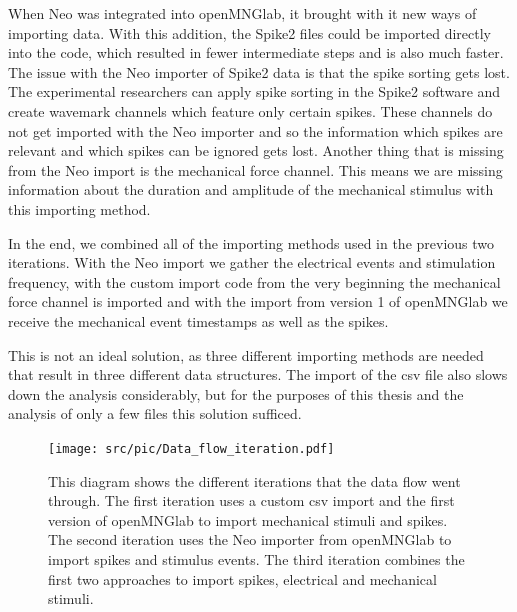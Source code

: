 When Neo was integrated into openMNGlab, it brought with it new ways of importing data. With this addition, the Spike2 files could be imported directly into the code, which resulted in fewer intermediate steps and is also much faster. The issue with the Neo importer of Spike2 data is that the spike sorting gets lost. The experimental researchers can apply spike sorting in the Spike2 software and create wavemark channels which feature only certain spikes. These channels do not get imported with the Neo importer and so the information which spikes are relevant and which spikes can be ignored gets lost. Another thing that is missing from the Neo import is the mechanical force channel. This means we are missing information about the duration and amplitude of the mechanical stimulus with this importing method.

In the end, we combined all of the importing methods used in the previous two iterations. With the Neo import we gather the electrical events and stimulation frequency, with the custom import code from the very beginning the mechanical force channel is imported and with the import from version 1 of openMNGlab we receive the mechanical event timestamps as well as the spikes.

This is not an ideal solution, as three different importing methods are needed that result in three different data structures. The import of the csv file also slows down the analysis considerably, but for the purposes of this thesis and the analysis of only a few files this solution sufficed.
\begin{figure}
	\texttt{[image: src/pic/Data\_flow\_iteration.pdf]}
	\caption{This diagram shows the different iterations that the data flow went through. The first iteration uses a custom csv import and the first version of openMNGlab to import mechanical stimuli and spikes. The second iteration uses the Neo importer from openMNGlab to import spikes and stimulus events. The third iteration combines the first two approaches to import spikes, electrical and mechanical stimuli.}
	\label{fig:import_iteration}
\end{figure}

